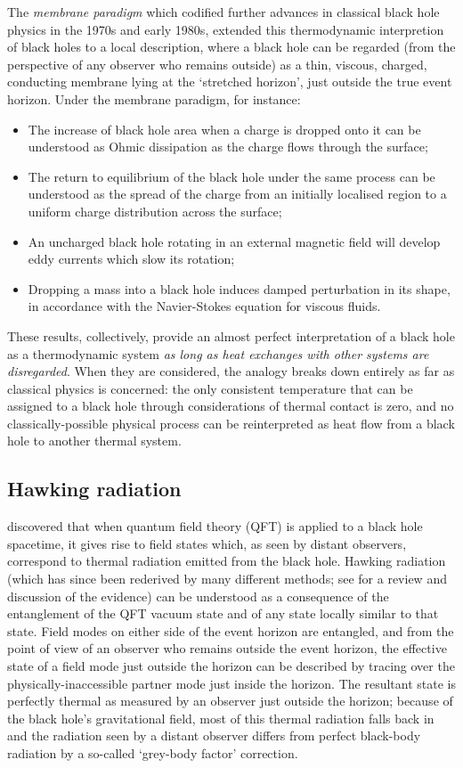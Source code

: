 \documentclass{article}
\begin{document}
The \emph{membrane paradigm} \cite{membraneparadigm} which codified further advances in classical black hole physics in the 1970s and early 1980s, extended this thermodynamic interpretion of black holes to a local description, where a black hole can be regarded (from the perspective of any observer who remains outside) as a thin, viscous, charged, conducting membrane lying at the `stretched horizon', just outside the true event horizon. Under the membrane paradigm, for instance:
\begin{itemize}
\item The increase of black hole area when a charge is dropped onto it can be understood as Ohmic dissipation as the charge flows through the surface;
\item The return to equilibrium of the black hole under the same process can be understood as the spread of the charge from an initially localised region to a uniform charge distribution across the surface;
\item An uncharged black hole rotating in an external magnetic field will develop eddy currents which slow its rotation;
\item Dropping a mass into a black hole induces damped perturbation in its shape, in accordance with the Navier-Stokes equation for viscous fluids.
\end{itemize}
These results, collectively, provide an almost perfect interpretation of a black hole as a thermodynamic system \emph{as long as heat exchanges with other systems are disregarded}. When they are considered, the analogy breaks down entirely as far as classical physics is concerned: the only consistent temperature that can be assigned to a black hole through considerations of thermal contact is zero, and no classically-possible physical process can be reinterpreted as heat flow from a black hole to another thermal system.

\subsection{Hawking radiation}

 discovered that when quantum field theory (QFT) is applied to a black hole spacetime, it gives rise to field states which, as seen by distant observers, correspond to thermal radiation emitted from the black hole. Hawking radiation (which has since been rederived by many different methods; see  for a review and discussion of the evidence) can be understood as a consequence of the entanglement of the QFT
vacuum state and of any state locally similar to that state. Field modes on either side of the event horizon are entangled, and from the point of view of an observer who remains outside the event horizon, the effective state of a field mode just outside the horizon can be described by tracing over the physically-inaccessible partner mode just inside the horizon. The resultant state is perfectly thermal as measured by an observer just outside the horizon; because of the black hole's gravitational field, most of this thermal radiation falls back in and the radiation seen by a distant observer differs from perfect black-body radiation by a so-called `grey-body factor' correction.
\end{document}

